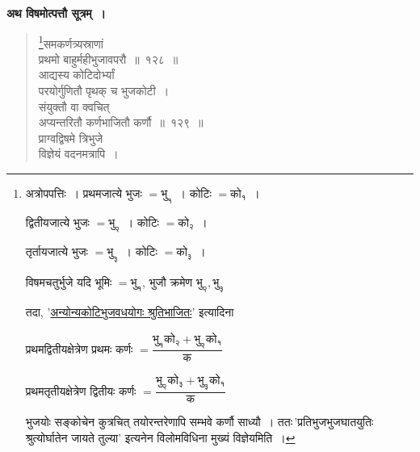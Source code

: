 \documentclass[11pt, openany]{book}
\begin{document}
\textbf{अथ विषमोत्पत्तौ सूत्रम्~।} 
\begin{quote}
    \bs 
    \footnote{अत्रोपपत्तिः~। प्रथमजात्ये भुजः $= \mbox{भु}_{\text{१}}$~। कोटिः $= \mbox{को}_{\text{१}}$~। 

\vspace{1mm}
\hspace{3mm} द्वितीयजात्ये भुजः $= \mbox{भु}_{\text{२}}$~। कोटिः $= \mbox{को}_{\text{२}}$~। 

\vspace{1mm}
\hspace{3mm} तृर्तायजात्ये भुजः $= \mbox{भु}_{\text{३}}$~। कोटिः $= \mbox{को}_{\text{३}}$~। 

\vspace{1mm}
\hspace{3mm} विषमचतुर्भुजे यदि भूमिः $= \mbox{भु}_{\text{१}}$, भुजौ क्रमेण $\mbox{भु}_{\text{२}}, \mbox{भु}_{\text{३}}$

\vspace{1mm}
\hspace{3mm} तदा, '\hyperref[4.126]{अन्योन्यकोटिभुजवधयोगः श्रुतिभाजितः}' इत्यादिना 

\vspace{1mm}
\hspace{3mm} प्रथमद्वितीयक्षेत्रेण प्रथमः कर्णः $= \dfrac{\mbox{भु}_{\text{१}}\mbox{को}_{\text{२}} + \mbox{भु}_{\text{२}}\mbox{को}_{\text{१}}}{\mbox{क}}$ 

\vspace{1mm}
\hspace{3mm} प्रथमतृतीयक्षेत्रेण द्वितीयः कर्णः $= \dfrac{\mbox{भु}_{\text{२}}\mbox{को}_{\text{३}} + \mbox{भु}_{\text{३}}\mbox{को}_{\text{१}}}{\mbox{क}}$ 

\vspace{1mm}
\hspace{3mm} भुजयोः सङ्कोचेन कुत्रचित् तयोरन्तरेणापि सम्भवे कर्णौ साध्यौ~। 
ततः\textendash \,'प्रतिभुजभुजघातयुतिः श्रुत्योर्घातेन जायते तुल्या' इत्यनेन
विलोमविधिना मुख्यं विज्ञेयमिति~।}समकर्णत्र्यस्राणां \\
प्रथमो बाहुर्महीभुजावपरौ~॥~१२८~॥~\\
 आद्यस्य कोटिदोर्भ्यां \\
परयोर्गुणितौ पृथक् च भुजकोटी~। \\
 संयुक्तौ वा क्वचित् \\
अप्यन्तरितौ कर्णभाजितौ कर्णौ~॥~१२९~॥~\\
 प्राग्वद्विषमे त्रिभुजे \\
विज्ञेयं वदनमत्रापि~। 
\end{quote}
 
\end{document}
